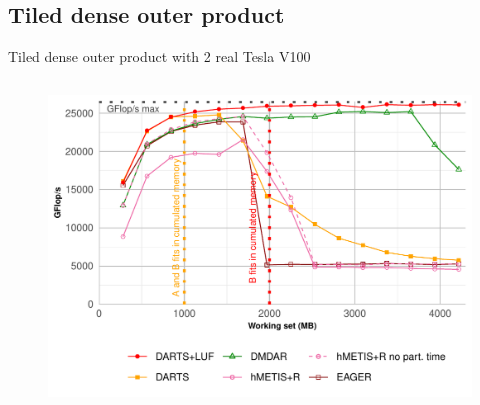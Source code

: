 \documentclass{libs/ufc_format}
\begin{document}
\subsection{Tiled dense outer product}
\begin{frame}{Tiled dense outer product with 2 real Tesla V100}
    \begin{columns}{}
        \begin{column}{0.5\textwidth}
	\begin{figure}
		\center\includegraphics[scale = 0.3]{Images/GF_dynamic_data_aware_no_hfp_gemini-2-ipdps_2GPU.pdf}
	\end{figure}
	\end{column}


\end{columns}
\end{frame}
\end{document}
